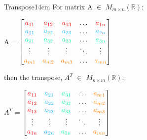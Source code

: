     \begin{definition}{Transpose}{14cm}
        For matrix A $\in$ $M_{m \times n}(\mathbb{R})$:
        
        \hspace{0.5cm}
        A =
        $
        \begin{bmatrix}
            {\color{red} a_{11}} & {\color{red} a_{12}}
                    & {\color{red} a_{13}} & \hdots & {\color{red} a_{1n}} \\
            {\color{lblue} a_{21}} & {\color{lblue} a_{22}}
                    & {\color{lblue} a_{23}} & \hdots & {\color{lblue} a_{2n}} \\
            {\color{green} a_{31}} & {\color{green} a_{32}} 
                    & {\color{green} a_{33}} & \hdots & {\color{green} a_{3n}} \\
            \vdots & \vdots & \vdots & \ddots & \vdots \\
            {\color{orange} a_{m1}} & {\color{orange} a_{m2}} 
                    & {\color{orange} a_{m3}} & \hdots & {\color{orange} a_{mn}} \\
        \end{bmatrix}
        $
        
        then the {\color{lblue} transpose},
        $A^T$ $\in$ $M_{n \times m}(\mathbb{R})$:

        \hspace{0.5cm}
        $A^T$ =
        $
        \begin{bmatrix}
            {\color{red} a_{11}} & {\color{lblue} a_{21}}
                    & {\color{green} a_{31}} & \hdots & {\color{orange} a_{m1}} \\
            {\color{red} a_{12}} & {\color{lblue} a_{22}}
                    & {\color{green} a_{32}} & \hdots & {\color{orange} a_{m2}} \\
            {\color{red} a_{13}} & {\color{lblue} a_{23}}
                    & {\color{green} a_{33}} & \hdots & {\color{orange} a_{m3}} \\
            \vdots & \vdots & \vdots & \ddots & \vdots \\
            {\color{red} a_{1n}} & {\color{lblue} a_{2n}}
                    & {\color{green} a_{3n}} & \hdots & {\color{orange} a_{mn}} \\
        \end{bmatrix}
        $
    \end{definition}

    \vspace{0.5cm}



